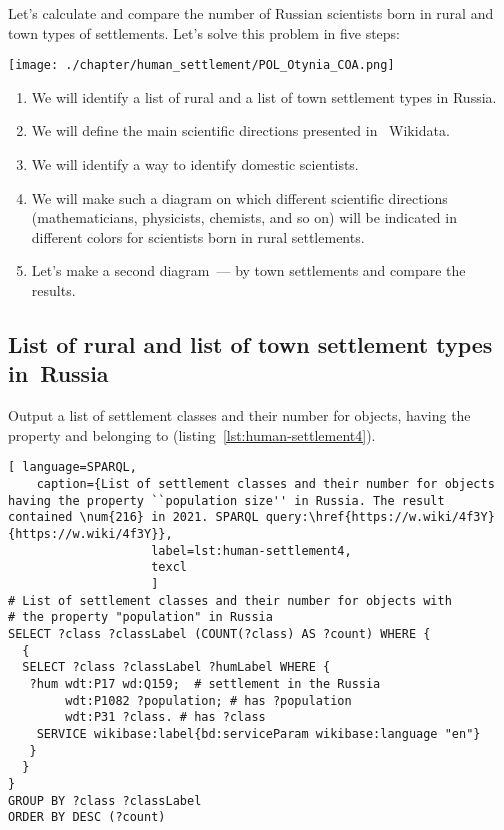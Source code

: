 Let's calculate and compare the number of Russian scientists born in rural and town types of settlements. 
Let's solve this problem in five steps:

\begin{marginfigure} [0.0 cm]
{\texttt{[image: ./chapter/human\_settlement/POL\_Otynia\_COA.png]}}
    \caption {The coat of arms of the ``human settlement'' of which country is depicted? \newline%
See~\protect\ref{answer:flag_human_settlements} on page~\protect\pageref{answer:flag_human_settlements}.}
    \label {fig:flag_question_human_settlements4}%
\end{marginfigure}

\begin{enumerate}
\item We will identify a list of rural and a list of town settlement types in Russia.
\item We will define the main scientific directions presented in ~Wikidata.
\item We will identify a way to identify domestic scientists.
\item We will make such a diagram on which different scientific directions (mathematicians, physicists, chemists, and so on) will be indicated in different colors for scientists born in rural settlements.
\item Let's make a second diagram~--- by town settlements and compare the results.
\end{enumerate}

\subsection{List of rural and list of town settlement types in~Russia}

Output a list of settlement classes and their number for objects, 
having the property 
and belonging to  (listing~\ref{lst:human-settlement4}).

\begin{lstlisting}[ language=SPARQL, 
    caption={List of settlement classes and their number for objects having the property ``population size'' in Russia. The result contained \num{216} in 2021. SPARQL query:\href{https://w.wiki/4f3Y}{https://w.wiki/4f3Y}}, 
                    label=lst:human-settlement4,
                    texcl 
                    ]
# List of settlement classes and their number for objects with 
# the property "population" in Russia
SELECT ?class ?classLabel (COUNT(?class) AS ?count) WHERE {
  {
  SELECT ?class ?classLabel ?humLabel WHERE {
   ?hum wdt:P17 wd:Q159;  # settlement in the Russia
        wdt:P1082 ?population; # has ?population
        wdt:P31 ?class. # has ?class
    SERVICE wikibase:label{bd:serviceParam wikibase:language "en"}
   }
  }
}
GROUP BY ?class ?classLabel
ORDER BY DESC (?count)
\end{lstlisting}%


